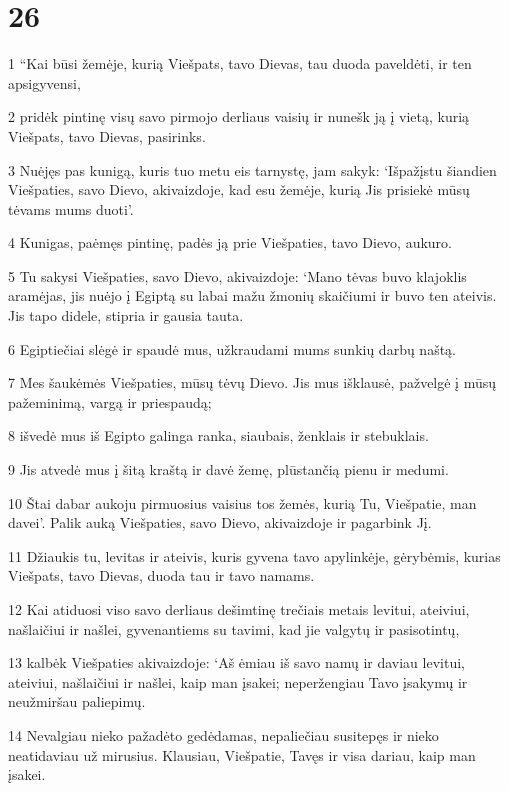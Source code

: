 \chapter{26}

\par 1 “Kai būsi žemėje, kurią Viešpats, tavo Dievas, tau duoda paveldėti, ir ten apsigyvensi, 
\par 2 pridėk pintinę visų savo pirmojo derliaus vaisių ir nunešk ją į vietą, kurią Viešpats, tavo Dievas, pasirinks. 
\par 3 Nuėjęs pas kunigą, kuris tuo metu eis tarnystę, jam sakyk: ‘Išpažįstu šiandien Viešpaties, savo Dievo, akivaizdoje, kad esu žemėje, kurią Jis prisiekė mūsų tėvams mums duoti’. 
\par 4 Kunigas, paėmęs pintinę, padės ją prie Viešpaties, tavo Dievo, aukuro. 
\par 5 Tu sakysi Viešpaties, savo Dievo, akivaizdoje: ‘Mano tėvas buvo klajoklis aramėjas, jis nuėjo į Egiptą su labai mažu žmonių skaičiumi ir buvo ten ateivis. Jis tapo didele, stipria ir gausia tauta. 
\par 6 Egiptiečiai slėgė ir spaudė mus, užkraudami mums sunkių darbų naštą. 
\par 7 Mes šaukėmės Viešpaties, mūsų tėvų Dievo. Jis mus išklausė, pažvelgė į mūsų pažeminimą, vargą ir priespaudą; 
\par 8 išvedė mus iš Egipto galinga ranka, siaubais, ženklais ir stebuklais. 
\par 9 Jis atvedė mus į šitą kraštą ir davė žemę, plūstančią pienu ir medumi. 
\par 10 Štai dabar aukoju pirmuosius vaisius tos žemės, kurią Tu, Viešpatie, man davei’. Palik auką Viešpaties, savo Dievo, akivaizdoje ir pagarbink Jį. 
\par 11 Džiaukis tu, levitas ir ateivis, kuris gyvena tavo apylinkėje, gėrybėmis, kurias Viešpats, tavo Dievas, duoda tau ir tavo namams. 
\par 12 Kai atiduosi viso savo derliaus dešimtinę trečiais metais levitui, ateiviui, našlaičiui ir našlei, gyvenantiems su tavimi, kad jie valgytų ir pasisotintų, 
\par 13 kalbėk Viešpaties akivaizdoje: ‘Aš ėmiau iš savo namų ir daviau levitui, ateiviui, našlaičiui ir našlei, kaip man įsakei; neperžengiau Tavo įsakymų ir neužmiršau paliepimų. 
\par 14 Nevalgiau nieko pažadėto gedėdamas, nepaliečiau susitepęs ir nieko neatidaviau už mirusius. Klausiau, Viešpatie, Tavęs ir visa dariau, kaip man įsakei. 
